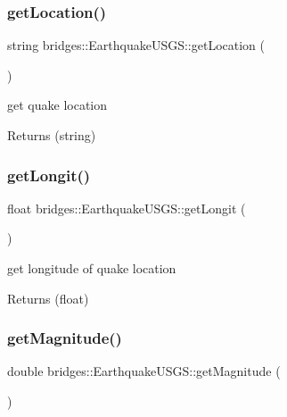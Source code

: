 \subsubsection{\texorpdfstring{get\+Location()}{getLocation()}}
{\footnotesize\ttfamily string bridges\+::\+Earthquake\+U\+S\+G\+S\+::get\+Location (\begin{DoxyParamCaption}{ }\end{DoxyParamCaption})\hspace{0.3cm}{\ttfamily [inline]}}

get quake location

\begin{DoxyReturn}{Returns}
(string) 
\end{DoxyReturn}
\mbox{\label{classbridges_1_1_earthquake_u_s_g_s_a63c2fed8b27dace2b988dd9c0c937d70}} 
\subsubsection{\texorpdfstring{get\+Longit()}{getLongit()}}
{\footnotesize\ttfamily float bridges\+::\+Earthquake\+U\+S\+G\+S\+::get\+Longit (\begin{DoxyParamCaption}{ }\end{DoxyParamCaption})\hspace{0.3cm}{\ttfamily [inline]}}

get longitude of quake location

\begin{DoxyReturn}{Returns}
(float) 
\end{DoxyReturn}
\mbox{\label{classbridges_1_1_earthquake_u_s_g_s_a51659fac2236aaaa03d2921fd7c1fcf9}} 
\subsubsection{\texorpdfstring{get\+Magnitude()}{getMagnitude()}}
{\footnotesize\ttfamily double bridges\+::\+Earthquake\+U\+S\+G\+S\+::get\+Magnitude (\begin{DoxyParamCaption}{ }\end{DoxyParamCaption})\hspace{0.3cm}{\ttfamily [inline]}}

